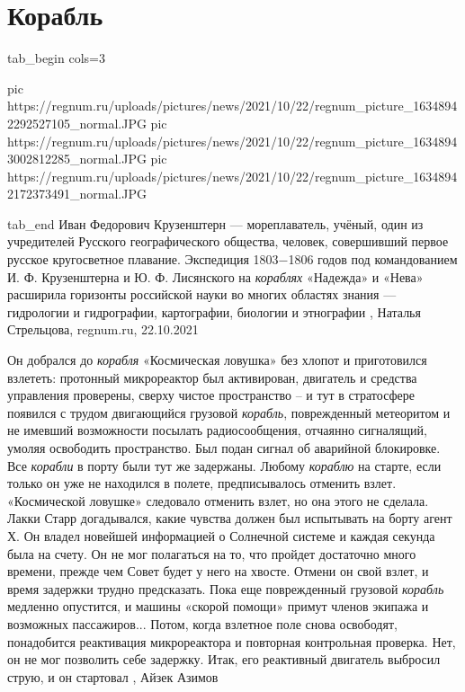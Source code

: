  
 
 
 
 
\chapter{Корабль}
\label{sec:slova.korabl}


\ifcmt
  tab_begin cols=3

     pic https://regnum.ru/uploads/pictures/news/2021/10/22/regnum_picture_16348942292527105_normal.JPG
     pic https://regnum.ru/uploads/pictures/news/2021/10/22/regnum_picture_16348943002812285_normal.JPG
		 pic https://regnum.ru/uploads/pictures/news/2021/10/22/regnum_picture_16348942172373491_normal.JPG

  tab_end
\fi
Иван Федорович Крузенштерн — мореплаватель, учёный, один из учредителей
Русского географического общества, человек, совершивший первое русское
кругосветное плавание. Экспедиция 1803−1806 годов под командованием И. Ф.
Крузенштерна и Ю. Ф. Лисянского на \emph{кораблях} «Надежда» и «Нева» расширила
горизонты российской науки во многих областях знания — гидрологии и
гидрографии, картографии, биологии и этнографии
, 
Наталья Стрельцова, regnum.ru, 22.10.2021

Он добрался до \emph{корабля} «Космическая ловушка» без хлопот и приготовился
взлететь: протонный микрореактор был активирован, двигатель и средства
управления проверены, сверху чистое пространство – и тут в стратосфере появился
с трудом двигающийся грузовой \emph{корабль}, поврежденный метеоритом и не имевший
возможности посылать радиосообщения, отчаянно сигналящий, умоляя освободить
пространство.  Был подан сигнал об аварийной блокировке. Все \emph{корабли} в порту
были тут же задержаны. Любому \emph{кораблю} на старте, если только он уже не
находился в полете, предписывалось отменить взлет.  «Космической ловушке»
следовало отменить взлет, но она этого не сделала. Лакки Старр догадывался,
какие чувства должен был испытывать на борту агент Х. Он владел новейшей
информацией о Солнечной системе и каждая секунда была на счету.  Он не мог
полагаться на то, что пройдет достаточно много времени, прежде чем Совет будет
у него на хвосте. Отмени он свой взлет, и время задержки трудно предсказать.
Пока еще поврежденный грузовой \emph{корабль} медленно опустится, и машины «скорой
помощи» примут членов экипажа и возможных пассажиров... Потом, когда взлетное
поле снова освободят, понадобится реактивация микрореактора и повторная
контрольная проверка. Нет, он не мог позволить себе задержку.  Итак, его
реактивный двигатель выбросил струю, и он стартовал
, Айзек Азимов

